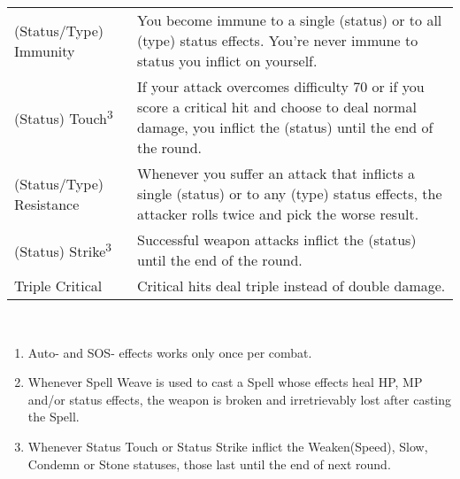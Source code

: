 \begin{table}[ht]
\begin{tabular}{p{}p{}}
        (Status/Type) Immunity & You become immune to a single (status) or to all (type) status effects. You're never immune to status you inflict on yourself. \\
        (Status) Touch\textsuperscript{3} & If your attack overcomes difficulty 70 or if you score a critical hit and choose to deal normal damage, you inflict the (status) until the end of the round. \\
        (Status/Type) Resistance & Whenever you suffer an attack that inflicts a single (status) or to any (type) status effects, the attacker rolls twice and pick the worse result. \\
        (Status) Strike\textsuperscript{3} & Successful weapon attacks inflict the (status) until the end of the round. \\
        Triple Critical & Critical hits deal triple instead of double damage. \\ \bottomrule
        \end{tabular} \\
\end{table}
\begin{footnotesize}
\begin{enumerate}
    \item Auto- and SOS- effects works only once per combat.
    \item Whenever Spell Weave is used to cast a Spell whose effects heal HP, MP and/or status effects, the weapon is broken and irretrievably lost after casting the Spell.
    \item Whenever Status Touch or Status Strike inflict the Weaken(Speed), Slow, Condemn or Stone statuses, those last until the end of next round.
\end{enumerate}
\end{footnotesize}